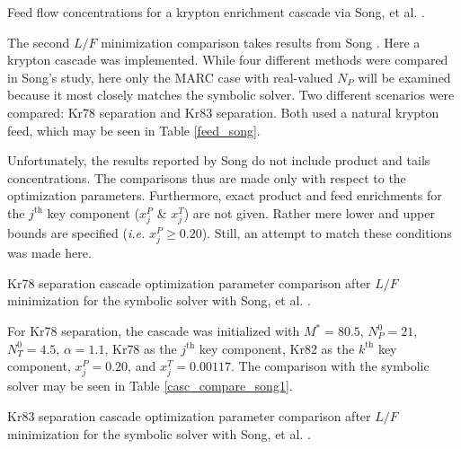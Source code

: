 \documentclass[preprint,12pt]{elsarticle}
\newcommand{\nuc}[2]{{#1}{#2}}
\newcommand{\jth}[0]{$j^{\mbox{th}}$ }
\newcommand{\kth}[0]{$k^{\mbox{th}}$ }
\begin{document}
\begin{table}[htbp]
\begin{center}
\caption{Feed flow concentrations for a krypton enrichment cascade via  
    Song, et al. \cite{doi:10.1080/01496391003793884}.}

\label{feed_song}
\end{center}
\end{table}

The second $L/F$ minimization comparison takes results from Song 
\cite{doi:10.1080/01496391003793884}.  Here a krypton
cascade was implemented.  While four different methods were compared in Song's study, 
here only the MARC case with real-valued $N_P$  will be examined because
it most closely matches the symbolic solver.  Two different scenarios were
compared: \nuc{Kr}{78} separation and \nuc{Kr}{83} separation.  Both used a 
natural krypton feed, which may be seen in Table \ref{feed_song}.

Unfortunately, the results reported by Song do not include product and tails 
concentrations.  The comparisons thus are made only with respect to 
the optimization parameters.  Furthermore, exact product and feed enrichments
for the \jth key component
($x_j^P$ \& $x_j^T$) are not given. Rather mere lower and upper bounds are specified
(\emph{i.e.} $x_j^P\ge0.20$).
Still, an attempt to match these conditions was made here.

\begin{table}[htbp]
\begin{center}
\caption{\nuc{Kr}{78} separation cascade optimization parameter comparison after 
    $L/F$ minimization for the symbolic 
    solver with Song, et al. \cite{doi:10.1080/01496391003793884}.}

\label{casc_compare_song1}
\end{center}
\end{table}

For \nuc{Kr}{78} separation, the cascade was initialized with $M^*=80.5$, 
$N_P^0=21$, $N_T^0=4.5$, $\alpha=1.1$, \nuc{Kr}{78} as the \jth key
component, \nuc{Kr}{82} as the \kth key component, $x_j^P=0.20$, and
$x_j^T=0.00117$.  The comparison with the symbolic solver may be seen in Table
\ref{casc_compare_song1}.

\begin{table}[htbp]
\begin{center}
\caption{\nuc{Kr}{83} separation cascade optimization parameter comparison after 
    $L/F$ minimization for the symbolic 
    solver with Song, et al. \cite{doi:10.1080/01496391003793884}.}

\label{casc_compare_song2}
\end{center}
\end{table}
\end{document}
